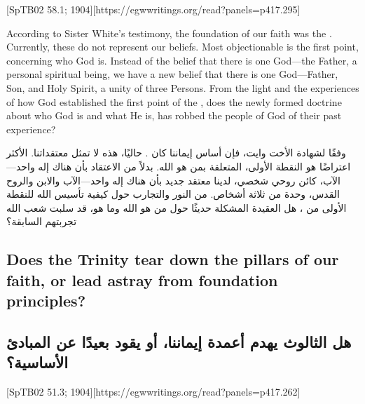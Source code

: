 [SpTB02 58.1; 1904][https://egwwritings.org/read?panels=p417.295]


According to Sister White’s testimony, the foundation of our faith was the . Currently, these do not represent our beliefs. Most objectionable is the first point, concerning who God is. Instead of the belief that there is one God—the Father, a personal spiritual being, we have a new belief that there is one God—Father, Son, and Holy Spirit, a unity of three Persons. From the light and the experiences of how God established the first point of the , does the newly formed doctrine about who God is and what He is, has robbed the people of God of their past experience?


وفقًا لشهادة الأخت وايت، فإن أساس إيماننا كان . حاليًا، هذه لا تمثل معتقداتنا. الأكثر اعتراضًا هو النقطة الأولى، المتعلقة بمن هو الله. بدلاً من الاعتقاد بأن هناك إله واحد—الآب، كائن روحي شخصي، لدينا معتقد جديد بأن هناك إله واحد—الآب والابن والروح القدس، وحدة من ثلاثة أشخاص. من النور والتجارب حول كيفية تأسيس الله للنقطة الأولى من ، هل العقيدة المشكلة حديثًا حول من هو الله وما هو، قد سلبت شعب الله تجربتهم السابقة؟


\subsection*{Does the Trinity tear down the pillars of our faith, or lead astray from foundation principles?}


\subsection*{هل الثالوث يهدم أعمدة إيماننا، أو يقود بعيدًا عن المبادئ الأساسية؟}


[SpTB02 51.3; 1904][https://egwwritings.org/read?panels=p417.262]


